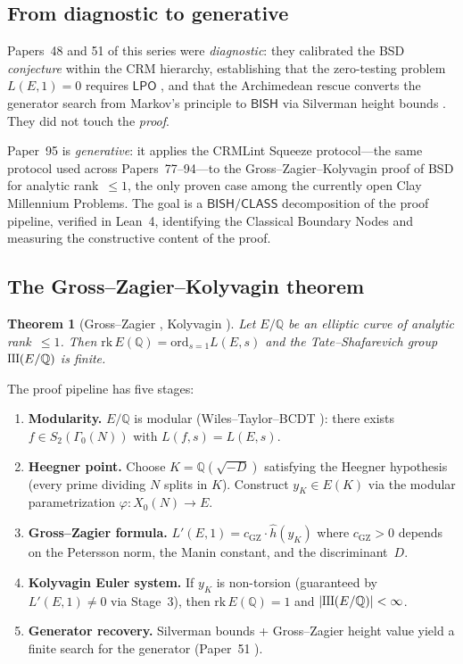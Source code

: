 \documentclass[11pt]{article}
\theoremstyle{plain}
\newtheorem{theorem}{Theorem}[section]
\theoremstyle{definition}
\theoremstyle{remark}
\newcommand{\Q}{\mathbb{Q}}
\newcommand{\Sha}{\text{\raisebox{0.05ex}{\scalebox{0.85}[1]{III}}}}
\newcommand{\rk}{\mathrm{rk}}
\newcommand{\ord}{\mathrm{ord}}
\newcommand{\BISH}{\ensuremath{\mathsf{BISH}}}
\newcommand{\LPO}{\ensuremath{\mathsf{LPO}}}
\newcommand{\CLASS}{\ensuremath{\mathsf{CLASS}}}
\newcommand{\hhat}{\hat{h}}
\begin{document}
\subsection{From diagnostic to generative}

Papers~48 and 51 of this series were \emph{diagnostic}: they calibrated the BSD \emph{conjecture} within the CRM hierarchy, establishing that the zero-testing problem $L(E,1) = 0$ requires $\LPO$ \cite{paper48}, and that the Archimedean rescue converts the generator search from Markov's principle to $\BISH$ via Silverman height bounds \cite{paper51}. They did not touch the \emph{proof}.

Paper~95 is \emph{generative}: it applies the CRMLint Squeeze protocol---the same protocol used across Papers~77--94---to the Gross--Zagier--Kolyvagin proof of BSD for analytic rank~$\leq 1$, the only proven case among the currently open Clay Millennium Problems. The goal is a $\BISH/\CLASS$ decomposition of the proof pipeline, verified in Lean~4, identifying the Classical Boundary Nodes and measuring the constructive content of the proof.

\subsection{The Gross--Zagier--Kolyvagin theorem}

\begin{theorem}[Gross--Zagier {\cite{gross-zagier}}, Kolyvagin {\cite{kolyvagin1988,kolyvagin1990}}]
\label{thm:gzk}
Let $E/\Q$ be an elliptic curve of analytic rank~$\leq 1$. Then $\rk\, E(\Q) = \ord_{s=1} L(E,s)$ and the Tate--Shafarevich group $\Sha(E/\Q)$ is finite.
\end{theorem}

The proof pipeline has five stages:
\begin{enumerate}[nosep,label=\textbf{S\arabic*.}]
\item \textbf{Modularity.} $E/\Q$ is modular (Wiles--Taylor--BCDT \cite{wiles,taylor-wiles,bcdt}): there exists $f \in S_2(\Gamma_0(N))$ with $L(f,s) = L(E,s)$.
\item \textbf{Heegner point.} Choose $K = \Q(\sqrt{-D})$ satisfying the Heegner hypothesis (every prime dividing $N$ splits in $K$). Construct $y_K \in E(K)$ via the modular parametrization $\varphi: X_0(N) \to E$.
\item \textbf{Gross--Zagier formula.} $L'(E,1) = c_{\mathrm{GZ}} \cdot \hhat(y_K)$ where $c_{\mathrm{GZ}} > 0$ depends on the Petersson norm, the Manin constant, and the discriminant~$D$.
\item \textbf{Kolyvagin Euler system.} If $y_K$ is non-torsion (guaranteed by $L'(E,1) \neq 0$ via Stage~3), then $\rk\, E(\Q) = 1$ and $|\Sha(E/\Q)| < \infty$.
\item \textbf{Generator recovery.} Silverman bounds + Gross--Zagier height value yield a finite search for the generator (Paper~51 \cite{paper51}).
\end{enumerate}
\end{document}
